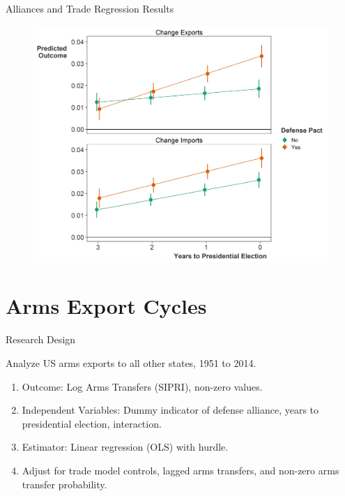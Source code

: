 \documentclass[12pt]{beamer}
\begin{document}

\begin{frame}{Alliances and Trade Regression Results}

\pause
\begin{figure}[htbp]
	\centering
		\includegraphics[height=.9\textheight]{us-elec-pred-exim.png}
\end{figure}

\end{frame} 




\section{Arms Export Cycles} 


\begin{frame}{Research Design}

\pause
Analyze US arms exports to all other states, 1951 to 2014. 
\pause
\begin{enumerate}
\item Outcome: Log Arms Transfers (SIPRI), non-zero values. 
\pause
\item Independent Variables: Dummy indicator of defense alliance, years to presidential election, interaction. 
\pause 
\item Estimator: Linear regression (OLS) with hurdle. 
\pause 
\item Adjust for trade model controls, lagged arms transfers, and non-zero arms transfer probability.
\end{enumerate} 

\end{frame} 
\end{document}
